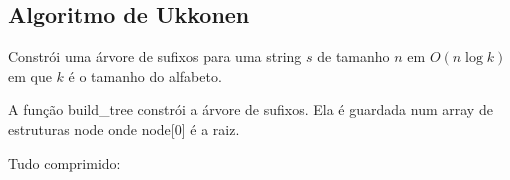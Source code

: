 \subsection{Algoritmo de Ukkonen}

Constrói uma árvore de sufixos para uma string $s$ de tamanho $n$ em $O(n \log k)$ em que $k$ é o tamanho do alfabeto.

A função build\_tree constrói a árvore de sufixos. Ela é guardada num array de estruturas node onde node[0] é a raiz.


Tudo comprimido:

